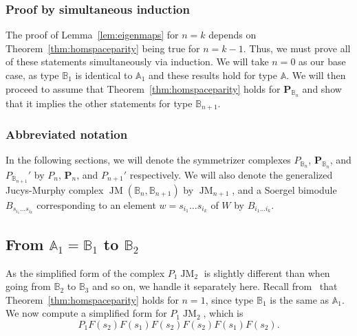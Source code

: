 \documentclass[11pt]{article}
\DeclareMathOperator{\JM}{JM}
\theoremstyle{definition}
\theoremstyle{remark}
\numberwithin{equation}{section}
\begin{document}
\subsubsection{Proof by simultaneous induction}
The proof of Lemma~\ref{lem:eigenmaps} for $n=k$
depends on Theorem~\ref{thm:homspaceparity}
being true for $n=k-1$. Thus, we must prove all of these statements
simultaneously via induction. We will take $n=0$ as our base case, as
type $\mathbb{B}_1$ is identical to $\mathbb{A}_1$
and these results hold for type $\mathbb{A}$. We
will then proceed to assume that Theorem~\ref{thm:homspaceparity} holds for
$\mathbf{P}_{\mathbb{B}_{n}}$ and show that it implies the other statements for
type $\mathbb{B}_{n+1}$.
\subsubsection{Abbreviated notation}
In the following sections, we will denote the symmetrizer
complexes $P_{\mathbb{B}_n}$,
$\mathbf{P}_{\mathbb{B}_n}$, and $P_{\mathbb{B}_{n+1}}'$ by $P_n$,
$\mathbf{P}_{n}$, and $P_{n+1}'$ respectively. We
will also denote the generalized Jucys-Murphy complex
$\JM(\mathbb{B}_{n},\mathbb{B}_{n+1})$ by $\JM_{n+1}$, and a Soergel bimodule
$B_{s_{i_1}\dots s_{i_k}}$ corresponding to an element
$w=s_{i_1}\dots s_{i_k}$ of $W$ by $B_{i_1\dots i_k}$.
\subsection{From $\mathbb{A}_1=\mathbb{B}_1$ to $\mathbb{B}_2$}
As the simplified form of the complex $P_1\JM_2$ is slightly different
than when going from $\mathbb{B}_{2}$ to $\mathbb{B}_3$
and so on, we handle it separately here.
Recall from~\cite{elias_computation_2019} that Theorem~\ref{thm:homspaceparity}
holds for $n=1$, since type $\mathbb{B}_1$ is the same as $\mathbb{A}_1$.
We now compute
a simplified form for $P_1\JM_2$, which is
\[P_1F(s_2)F(s_1)F(s_2)F(s_2)F(s_1)F(s_2).\]
\end{document}
